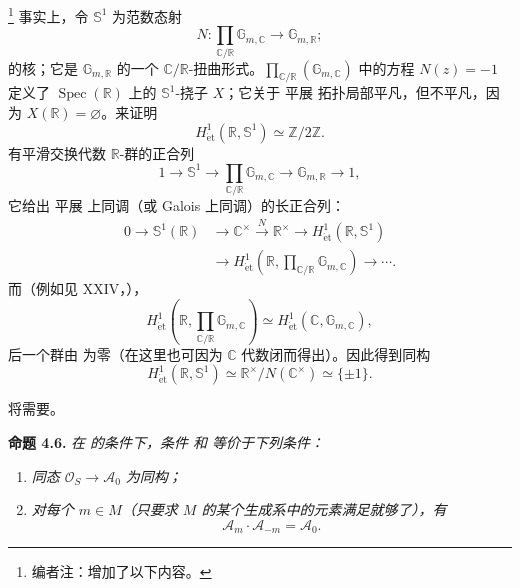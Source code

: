 \footnote{编者注：增加了以下内容。}
事实上，令 \(\mathbb S^1\) 为范数态射
\[
  N:\prod_{\mathbb C/\mathbb R}\mathbb G_{m,\mathbb C}
  \longrightarrow\mathbb G_{m,\mathbb R};
\]
的核；它是 \(\mathbb G_{m,\mathbb R}\) 的一个 \(\mathbb C/\mathbb R\)-扭曲形式。\(\prod_{\mathbb C/\mathbb R}(\mathbb G_{m,\mathbb C})\) 中的方程 \(N(z)=-1\) 定义了 \(\operatorname{Spec}(\mathbb R)\) 上的 \(\mathbb S^1\)-挠子 \(X\)；它关于 平展 拓扑局部平凡，但不平凡，因为 \(X(\mathbb R)=\varnothing\)。来证明
\[
  H^1_{\mathrm{\acute et}}(\mathbb R,\mathbb S^1)
  \simeq\mathbb Z/2\mathbb Z.
\]
有平滑交换代数 \(\mathbb R\)-群的正合列
\[
  1\longrightarrow\mathbb S^1
  \longrightarrow\prod_{\mathbb C/\mathbb R}\mathbb G_{m,\mathbb C}
  \longrightarrow\mathbb G_{m,\mathbb R}
  \longrightarrow1,
\]
它给出 平展 上同调（或 Galois 上同调）的长正合列：
\[
\begin{aligned}
  0\longrightarrow\mathbb S^1(\mathbb R)
  &\longrightarrow\mathbb C^\times
   \xrightarrow{N}\mathbb R^\times
   \longrightarrow H^1_{\mathrm{\acute et}}(\mathbb R,\mathbb S^1)\\
  &\longrightarrow
   H^1_{\mathrm{\acute et}}\!
   \left(\mathbb R,
     \prod_{\mathbb C/\mathbb R}\mathbb G_{m,\mathbb C}\right)
   \longrightarrow\cdots .
\end{aligned}
\]
而（例如见 XXIV，），
\[
  H^1_{\mathrm{\acute et}}\!
  \left(\mathbb R,
    \prod_{\mathbb C/\mathbb R}\mathbb G_{m,\mathbb C}\right)
  \simeq
  H^1_{\mathrm{\acute et}}(\mathbb C,\mathbb G_{m,\mathbb C}),
\]
后一个群由  为零（在这里也可因为 \(\mathbb C\) 代数闭而得出）。因此得到同构
\[
  H^1_{\mathrm{\acute et}}(\mathbb R,\mathbb S^1)
  \simeq\mathbb R^\times/N(\mathbb C^\times)
  \simeq\{\pm1\}.
\]

将需要。

\medskip
\noindent{}\textbf{命题 4.6.}
\textit{在  的条件下，条件  和  等价于下列条件：}
\begin{enumerate}
  \item[\((a')\)]
  \textit{同态 \(\mathcal O_S\to\mathscr A_0\) 为同构；}

  \item[\((b')\)]
  \textit{对每个 \(m\in M\)（只要求 \(M\) 的某个生成系中的元素满足就够了），有}
  \[
    \mathscr A_m\mathbin{\cdot}\mathscr A_{-m}=\mathscr A_0.
  \]
\end{enumerate}

